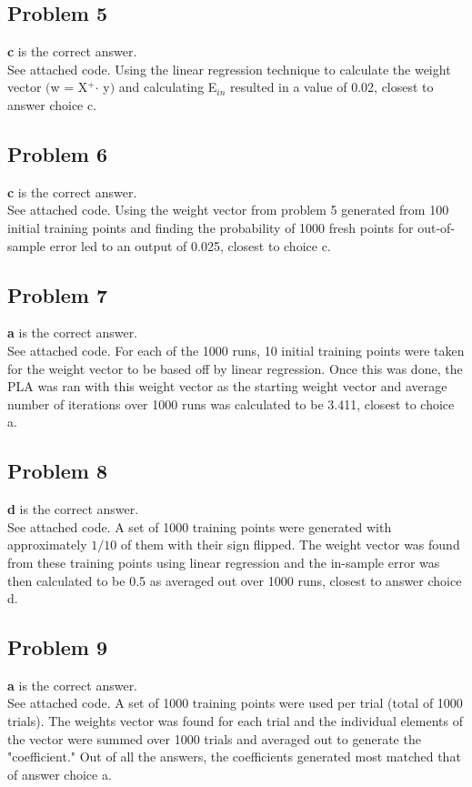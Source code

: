 \documentclass[12 pt]{article}
\begin{document}
	\subsection*{Problem 5}
	\textbf{c} is the correct answer.\\
	See attached code. Using the linear regression technique to calculate the weight vector $($w = X$^+$$\cdot$ y$)$ and calculating E$_{in}$ resulted in a value of 0.02, closest to answer choice c.
		
	\subsection*{Problem 6}
	\textbf{c} is the correct answer. \\
	See attached code. Using the weight vector from problem 5 generated from 100 initial training points and finding the probability of 1000 fresh points for out-of-sample error led to an output of 0.025, closest to choice c.
	
		
	\subsection*{Problem 7}
	\textbf{a} is the correct answer. \\
	See attached code. For each of the 1000 runs, 10 initial training points were taken for the weight vector to be based off by linear regression. Once this was done, the PLA was ran with this weight vector as the starting weight vector and average number of iterations over 1000 runs was calculated to be 3.411, closest to choice a.
		
	
	\subsection*{Problem 8}
	\textbf{d} is the correct answer. \\
	See attached code. A set of 1000 training points were generated with approximately $1/10$ of them with their sign flipped. The weight vector was found from these training points using linear regression and the in-sample error was then calculated to be 0.5 as averaged out over 1000 runs, closest to answer choice d.
	

	
	\subsection*{Problem 9}
	\textbf{a} is the correct answer. \\
	See attached code. A set of 1000 training points were used per trial (total of 1000 trials). The weights vector was found for each trial and the individual elements of the vector were summed over 1000 trials and averaged out to generate the "coefficient." Out of all the answers, the coefficients generated most matched that of answer choice a.
	
\end{document}
